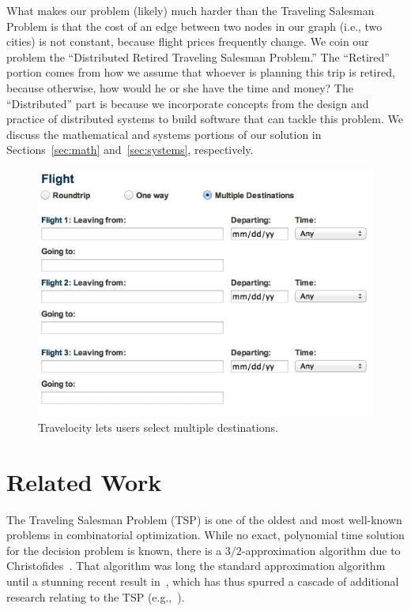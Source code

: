 \documentclass{article}
\begin{document}
What makes our problem (likely) much harder than the Traveling Salesman Problem is that the cost of an edge between two nodes in our graph (i.e., two
cities) is not constant, because flight prices frequently change. We coin our problem the ``Distributed Retired Traveling Salesman Problem.'' The
``Retired'' portion comes from how we assume that whoever is planning this trip is retired, because otherwise, how would he or she have the time and
money? The ``Distributed'' part is because we incorporate concepts from the design and practice of distributed systems to build software that can
tackle this problem. We discuss the mathematical and systems portions of our solution in Sections~\ref{sec:math} and~\ref{sec:systems}, respectively.

\begin{figure}[t]
\vskip 0.2in
\begin{center}
\centerline{\includegraphics[width=\columnwidth]{travelocity}}
\caption{Travelocity lets users select multiple destinations.}
\label{fig:travelocity}
\end{center}
\vskip -0.2in
\end{figure}

\section{Related Work}\label{sec:related_work}

The Traveling Salesman Problem (TSP) is one of the oldest and most well-known problems in combinatorial optimization. While no exact, polynomial time
solution for the decision problem is known, there is a $3/2$-approximation algorithm due to Christofides~\cite{Chr76}. That algorithm was long the
standard approximation algorithm until a stunning recent result in~\cite{conf/focs/GharanSS11}, which has thus spurred a cascade of additional
research relating to the TSP (e.g.,~\cite{Moemke:2011:AGT:2082752.2082898}).
\end{document}
